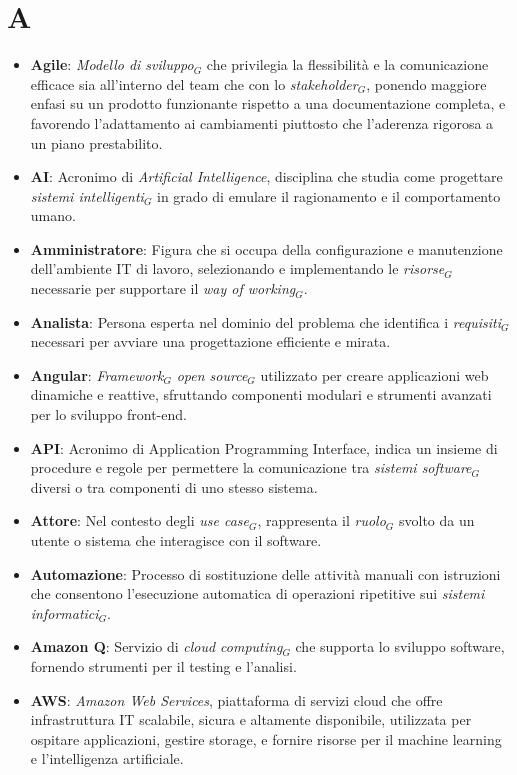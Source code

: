 \section{A}
\begin{itemize}
    \item \textbf{Agile}: \textit{Modello di sviluppo}$_G$ che privilegia la flessibilità e la comunicazione efficace sia all'interno del team che con lo \textit{stakeholder}$_G$, ponendo maggiore enfasi su un prodotto funzionante rispetto a una documentazione completa, e favorendo l'adattamento ai cambiamenti piuttosto che l'aderenza rigorosa a un piano prestabilito.
    \item \textbf{AI}: Acronimo di  \textit{Artificial Intelligence}, disciplina che studia come progettare \textit{sistemi intelligenti}$_G$ in grado di emulare il ragionamento e il comportamento umano.
    \item \textbf{Amministratore}: Figura che si occupa della configurazione e manutenzione dell'ambiente IT di lavoro, selezionando e implementando le \textit{risorse}$_G$ necessarie per supportare il \textit{way of working}$_G$.
    \item \textbf{Analista}: Persona esperta nel dominio del problema che identifica i \textit{requisiti}$_G$ necessari per avviare una progettazione efficiente e mirata.
    \item \textbf{Angular}: \textit{Framework}$_G$ \textit{open source}$_G$ utilizzato per creare applicazioni web dinamiche e reattive, sfruttando componenti modulari e strumenti avanzati per lo sviluppo front-end.
    \item \textbf{API}: Acronimo di Application Programming Interface, indica un insieme di procedure e regole per permettere la comunicazione tra \textit{sistemi software}$_G$ diversi o tra componenti di uno stesso sistema.
    \item \textbf{Attore}: Nel contesto degli \textit{use case}$_G$, rappresenta il \textit{ruolo}$_G$ svolto da un utente o sistema che interagisce con il software.
    \item \textbf{Automazione}: Processo di sostituzione delle attività manuali con istruzioni che consentono l'esecuzione automatica di operazioni ripetitive sui \textit{sistemi informatici}$_G$.
    \item \textbf{Amazon Q}: Servizio di \textit{cloud computing}$_G$ che supporta lo sviluppo software, fornendo strumenti per il testing e l’analisi.
    \item \textbf{AWS}: \textit{Amazon Web Services}, piattaforma di servizi cloud che offre infrastruttura IT scalabile, sicura e altamente disponibile, utilizzata per ospitare applicazioni, gestire storage, e fornire risorse per il machine learning e l'intelligenza artificiale.

\end{itemize}
